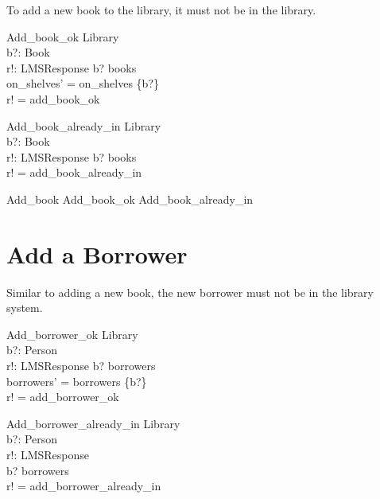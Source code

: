 \documentclass[11pt, fuzz]{article}
\begin{document}
To add a new book to the library, it must not be in the library. 

\begin{schema}{Add\_book\_ok}
    \Delta Library  \\
    b?: Book        \\
    r!: LMSResponse 
\where
    b? \notin books                      \\
    on\_shelves' = on\_shelves \cup \{b?\} \\
    r! = add\_book\_ok
\end{schema}

\begin{schema}{Add\_book\_already\_in}
    \Xi Library     \\
    b?: Book        \\
    r!: LMSResponse
\where
    b? \in books                \\
    r! = add\_book\_already\_in
\end{schema}

\begin{zed}
    Add\_book  Add\_book\_ok \lor Add\_book\_already\_in
\end{zed}


\section{Add a Borrower}

Similar to adding a new book, the new borrower must not be in the library system. 

\begin{schema}{Add\_borrower\_ok}
    \Delta Library  \\
    b?: Person      \\
    r!: LMSResponse
\where
    b? \notin borrowers                \\
    borrowers' = borrowers \cup \{b?\} \\
    r! = add\_borrower\_ok    
\end{schema}

\begin{schema}{Add\_borrower\_already\_in}
    \Xi Library     \\
    b?: Person      \\
    r!: LMSResponse \\
\where
    b? \in borrowers                \\
    r! = add\_borrower\_already\_in
\end{schema}
\end{document}
